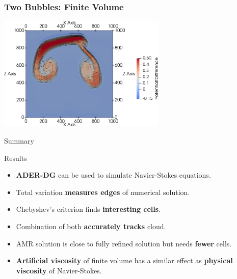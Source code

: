 \documentclass[aspectratio=169]{beamer}
\begin{document}
\begin{frame}
  \frametitle{Two Bubbles: Finite Volume}
  \begin{center}
    \includegraphics[width=0.6\textwidth]{paper_two_bubbles_fv}
  \end{center}
\end{frame}

\begin{frame}{Summary}
  \begin{block}{Results}
    \begin{itemize}
    \item \textbf{ADER-DG} can be used to simulate Navier-Stokes equations.
    \item Total variation \textbf{measures edges} of numerical solution.
    \item Chebyshev's criterion finds \textbf{interesting cells}.
    \item Combination of both \textbf{accurately tracks} cloud.
    \item AMR solution is close to fully refined solution but needs \textbf{fewer} cells.
    \item \textbf{Artificial viscosity} of finite volume has a similar effect as \textbf{physical viscosity} of Navier-Stokes.  
    \end{itemize}
  \end{block}
\end{frame}
\end{document}
